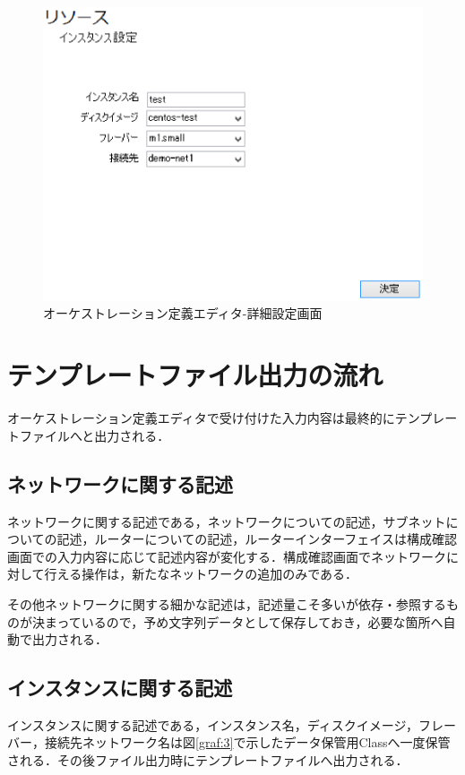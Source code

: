 \documentclass[mingoth]{kut-paper}		%
\begin{document}
			\begin{figure}[H]
				\begin{center}
					\includegraphics[scale=0.55]{Document/詳細設定画面.eps}
					\caption{オーケストレーション定義エディタ-詳細設定画面}
					\label{pic:4}
				\end{center}
			\end{figure}
	\section{テンプレートファイル出力の流れ}
	オーケストレーション定義エディタで受け付けた入力内容は最終的にテンプレートファイルへと出力される．
		\subsection{ネットワークに関する記述}
		ネットワークに関する記述である，ネットワークについての記述，サブネットについての記述，ルーターについての記述，ルーターインターフェイスは構成確認画面での入力内容に応じて記述内容が変化する．構成確認画面でネットワークに対して行える操作は，新たなネットワークの追加のみである．
		
		その他ネットワークに関する細かな記述は，記述量こそ多いが依存・参照するものが決まっているので，予め文字列データとして保存しておき，必要な箇所へ自動で出力される．
		\subsection{インスタンスに関する記述}
		インスタンスに関する記述である，インスタンス名，ディスクイメージ，フレーバー，接続先ネットワーク名は図\ref{graf:3}で示したデータ保管用Classへ一度保管される．その後ファイル出力時にテンプレートファイルへ出力される．
\end{document}
